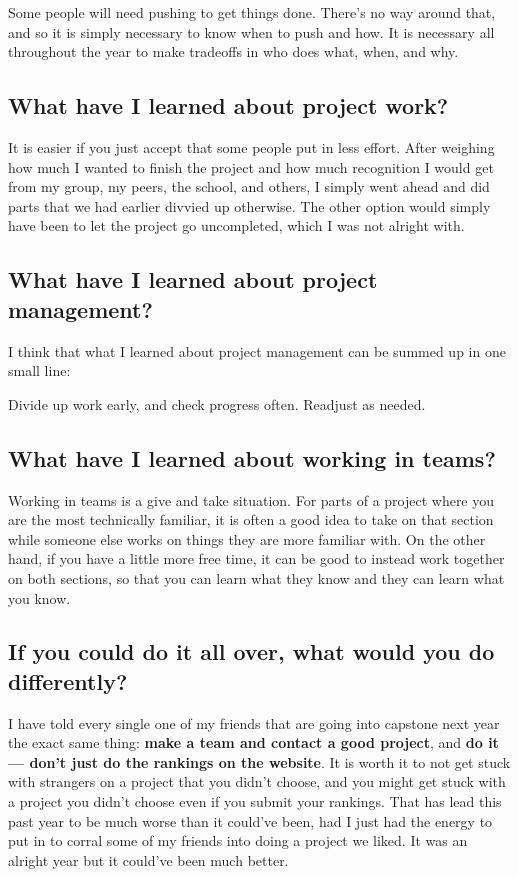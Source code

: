 \documentclass[onecolumn, draftclsnofoot,10pt, compsoc]{IEEEtran}
\begin{document}
Some people will need pushing to get things done. There's no way around that, and
so it is simply necessary to know when to push and how. It is necessary all throughout
the year to make tradeoffs in who does what, when, and why.

\subsection{What have I learned about project work?}

It is easier if you just accept that some people put in less effort. After weighing
how much I wanted to finish the project and how much recognition I would get from
my group, my peers, the school, and others, I simply went ahead and did parts that
we had earlier divvied up otherwise. The other option would simply have been to
let the project go uncompleted, which I was not alright with.

\subsection{What have I learned about project management?}

I think that what I learned about project management can be summed up in one small line:

\begin{displayquote}
Divide up work early, and check progress often. Readjust as needed.
\end{displayquote}

\subsection{What have I learned about working in teams?}

Working in teams is a give and take situation. For parts of a project where you
are the most technically familiar, it is often a good idea to take on that section
while someone else works on things they are more familiar with. On the other hand,
if you have a little more free time, it can be good to instead work together on
both sections, so that you can learn what they know and they can learn what you
know.

\subsection{If you could do it all over, what would you do differently?}

I have told every single one of my friends that are going into capstone next year
the exact same thing: \textbf{make a team and contact a good project}, and
\textbf{do it --- don't just do the rankings on the website}. It is worth
it to not get stuck with strangers on a project that you didn't choose, and you
might get stuck with a project you didn't choose even if you submit your rankings.
That has lead this past year to be much worse than it could've been, had I just
had the energy to put in to corral some of my friends into doing a project we
liked. It was an alright year but it could've been much better.
\end{document}
